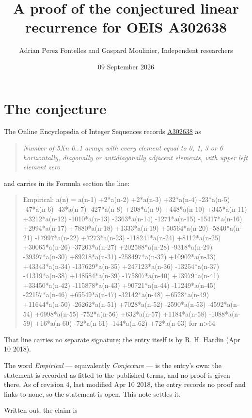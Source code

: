 \documentclass[11pt]{article}
\title{A proof of the conjectured linear recurrence for OEIS A302638}
\author{Adrian Perez Fontelles and Gaspard Moulinier, Independent researchers}
\date{09 September 2026}
\theoremstyle{definition}
\begin{document}
\maketitle
\section{The conjecture}

The Online Encyclopedia of Integer Sequences records \href{https://oeis.org/A302638}{A302638} as

\begin{quote}\itshape Number of 5Xn 0..1 arrays with every element equal to 0, 1, 3 or 6 horizontally, diagonally or antidiagonally adjacent elements, with upper left element zero\end{quote}

and carries in its Formula section the line:

\begin{quote}\ttfamily Empirical: a(n) = a(n-1) +2*a(n-2) +2*a(n-3) +32*a(n-4) -23*a(n-5) -47*a(n-6) -43*a(n-7) -427*a(n-8) +208*a(n-9) +448*a(n-10) +345*a(n-11) +3212*a(n-12) -1010*a(n-13) -2363*a(n-14) -1271*a(n-15) -15417*a(n-16) +2994*a(n-17) +7880*a(n-18) +1333*a(n-19) +50564*a(n-20) -5840*a(n-21) -17997*a(n-22) +7273*a(n-23) -118241*a(n-24) +8112*a(n-25) +30065*a(n-26) -37203*a(n-27) +202588*a(n-28) -9318*a(n-29) -39397*a(n-30) +89218*a(n-31) -258497*a(n-32) +10902*a(n-33) +43343*a(n-34) -137629*a(n-35) +247123*a(n-36) -13254*a(n-37) -41319*a(n-38) +148584*a(n-39) -175807*a(n-40) +13979*a(n-41) +33450*a(n-42) -115878*a(n-43) +90721*a(n-44) -11249*a(n-45) -22157*a(n-46) +65549*a(n-47) -32142*a(n-48) +6528*a(n-49) +11644*a(n-50) -26262*a(n-51) +7028*a(n-52) -2590*a(n-53) -4592*a(n-54) +6998*a(n-55) -752*a(n-56) +632*a(n-57) +1184*a(n-58) -1088*a(n-59) +16*a(n-60) -72*a(n-61) -144*a(n-62) +72*a(n-63) for n>64\end{quote}

That line carries no separate signature; the entry itself is by R. H. Hardin (Apr 10 2018).

The word {\itshape Empirical} --- equivalently {\itshape Conjecture} --- is the entry's own: the statement is recorded as fitted to the published terms, and no proof is given there. As of revision 4, last modified Apr 10 2018, the entry records no proof and links to none, so the statement is open. This note settles it.

Written out, the claim is
\end{document}
